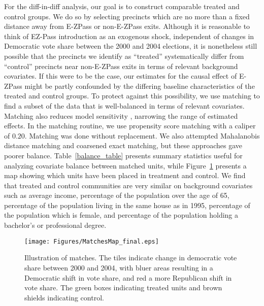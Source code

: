 
For the diff-in-diff analysis, our goal is to construct comparable treated and control groups. We do so by selecting precincts which are no more than a fixed distance away from E-ZPass or non-E-ZPass exits. Although it is reasonable to think of EZ-Pass introduction as an exogenous shock, independent of changes in Democratic vote share between the 2000 and 2004 elections, it is nonetheless still possible that the precincts we identify as ``treated'' systematically differ from ``control'' precincts near non-E-ZPass exits in terms of relevant background covariates. If this were to be the case, our estimates for the causal effect of E-ZPass might be partly confounded by the differing baseline characteristics of the treated and control groups. To protect against this possibility, we use matching to find a subset of the data that is well-balanced in terms of relevant covariates. Matching also reduces model sensitivity \parencite{Ho2007}, narrowing the range of estimated effects. In the matching routine, we use propensity score matching with a caliper of $0.20$. Matching was done without replacement. We also attempted Mahalanobis distance matching and coarsened exact matching, but these approaches gave poorer balance. Table~\vref{balance_table} presents summary statistics useful for analyzing covariate balance between matched units, while Figure~\ref{matches} presents a map showing which units have been placed in treatment and control. We find that treated and control communities are very similar on background covariates such as average income, percentage of the population over the age of 65, percentage of the population living in the same house as in 1995, percentage of the population which is female, and percentage of the population holding a bachelor's or professional degree. 





\begin{figure}[!htb]
    \centering
    \caption{Illustration of matches.  The tiles indicate change in democratic vote share between 2000 and 2004, with bluer areas resulting in a Democratic shift in vote share, and red a more Republican shift in vote share. The green boxes indicating treated units and brown shields indicating control.}
 \texttt{[image: Figures/MatchesMap\_final.eps]}
\label{matches}
\end{figure}

